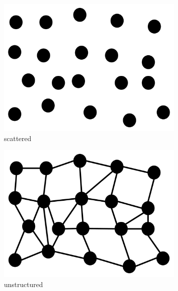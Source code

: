 \begin{figure}
  \begin{subfigure}[b]{0.19\textwidth}
    \includegraphics[clip=true, width=\textwidth]{Images/Scattered.pdf}
    \caption{scattered}
    \label{fig:scattered}
  \end{subfigure}
  \begin{subfigure}[b]{0.2\textwidth}
    \includegraphics[clip=true, width=\textwidth]{Images/Unstructured.pdf}
    \caption{unstructured}
    \label{fig:unstructured}
  \end{subfigure}
  \begin{subfigure}[b]{0.2\textwidth}

\end{subfigure}
\end{figure}
